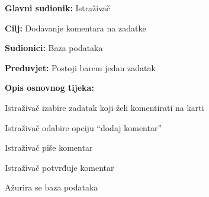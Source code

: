 					\noindent {}
					\begin{packed_item}
	
						\item \textbf{Glavni sudionik: } Istraživač
						\item  \textbf{Cilj:} Dodavanje komentara na zadatke
						\item  \textbf{Sudionici:} Baza podataka
						\item  \textbf{Preduvjet:} Postoji barem jedan zadatak
						\item  \textbf{Opis osnovnog tijeka:}
						
						\item[] \begin{packed_enum}
	
							\item 	Istraživač izabire zadatak koji želi komentirati na karti
							\item 	Istraživač odabire opciju “dodaj komentar”
							\item 	Istraživač piše komentar
							\item 	Istraživač potvrđuje komentar
							\item 	Ažurira se baza podataka
							
							
						\end{packed_enum}
					\end{packed_item}%
					\noindent {}
